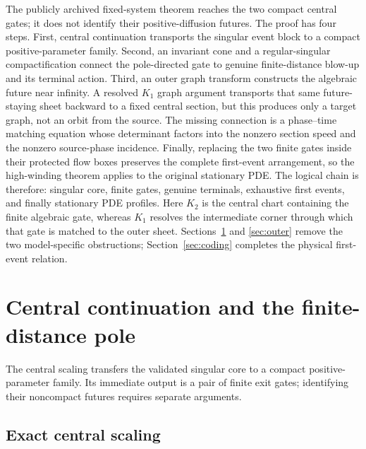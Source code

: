 \documentclass[11pt,reqno]{amsart}
\numberwithin{equation}{section}
\theoremstyle{definition}
\theoremstyle{remark}
\begin{document}
The publicly archived fixed-system theorem reaches the two compact central gates; it
does not identify their positive-diffusion futures.  The proof has four
steps.  First, central continuation transports the singular event block to a
compact positive-parameter family.  Second, an invariant cone and a
regular-singular compactification connect the pole-directed gate to genuine
finite-distance blow-up and its terminal action.  Third, an outer graph
transform constructs the algebraic future near infinity.  A resolved $K_1$
graph argument transports that same future-staying sheet backward to a fixed
central section, but this produces only a target graph, not an orbit from the
source.  The missing connection is a phase--time matching equation whose
determinant factors into the nonzero section speed and the nonzero
source-phase incidence.  Finally, replacing the two finite gates inside their
protected flow boxes preserves the complete first-event arrangement, so the
high-winding theorem applies to the original stationary PDE.  The logical
chain is therefore: singular core, finite gates, genuine terminals,
exhaustive first events, and finally stationary PDE profiles.
Here $K_2$ is the central chart containing the finite algebraic gate, whereas
$K_1$ resolves the intermediate corner through which that gate is matched to
the outer sheet.  Sections~\ref{sec:pole} and \ref{sec:outer} remove the two
model-specific obstructions; Section~\ref{sec:coding} completes the physical
first-event relation.

\section{Central continuation and the finite-distance pole}\label{sec:pole}

The central scaling transfers the validated singular core to a compact
positive-parameter family.  Its immediate output is a pair of finite exit
gates; identifying their noncompact futures requires separate arguments.

\subsection{Exact central scaling}
\end{document}
